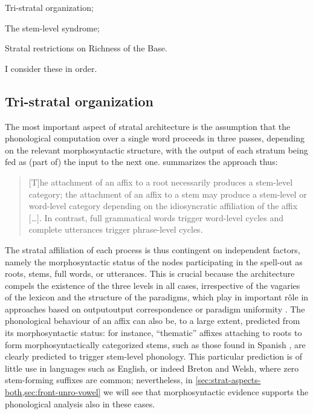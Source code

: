\begin{itemize*}
\item Tri\hyp stratal organization;
\item The stem-level syndrome;
\item Stratal restrictions on Richness of the Base.
\end{itemize*}

I consider these in order.

\subsection{Tri\hyp stratal organization}
\label{sec:trihyp-strat-organ}

The most important aspect of stratal architecture is the assumption that the phonological computation over a single word proceeds in three passes, depending on the relevant morphosyntactic structure, with the output of each stratum being fed as (part of) the input to the next one. \citet{bermúdez-otero11:_cyclic} summarizes the approach thus: \blockquote{[T]he attachment of an affix to a root necessarily produces a stem-level category; the attachment of an affix to a stem may produce a stem-level or word-level category depending on the idiosyncratic affiliation of the affix [\ldots]. In contrast, full grammatical words trigger word-level cycles and complete utterances trigger phrase-level cycles.} The stratal affiliation of each process is thus contingent on independent factors, namely the morphosyntactic status of the nodes participating in the spell\hyp out as roots, stems, full words, or utterances. This is crucial because the architecture compels the existence of the three levels in all cases, irrespective of the vagaries of the lexicon and the structure of the paradigms, which play in important rôle in approaches based on output\endash output correspondence or paradigm uniformity \citep{bermúdez-otero11:_cyclic,bermudez-oterong}. The phonological behaviour of an affix can also be, to a large extent, predicted from its morphosyntactic status: for instance, \enquote{thematic} affixes attaching to roots to form morphosyntactically categorized stems, such as those found in Spanish \citep{bermudez-otero06:_morph_spanis}, are clearly predicted to trigger stem\hyp level phonology. This particular prediction is of little use in languages such as English, or indeed Breton and Welsh, where zero stem\hyp forming suffixes are common; nevertheless, in \cref{sec:strat-aspects-both,sec:front-unro-vowel} we will see that morphosyntactic evidence supports the phonological analysis also in these cases.

